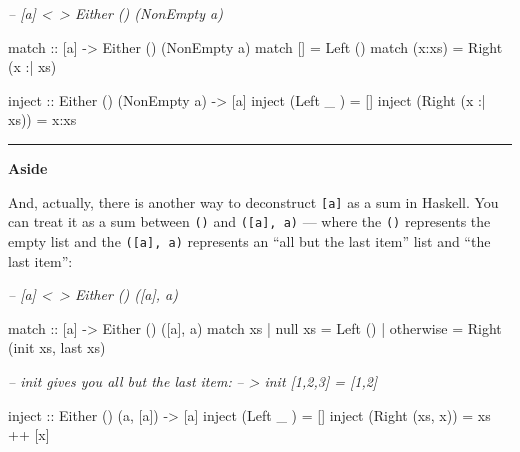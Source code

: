 \documentclass[]{article}
\newenvironment{Shaded}{}{}
\newcommand{\CommentTok}[1]{\textcolor[rgb]{0.38,0.63,0.69}{\textit{#1}}}
\newcommand{\DataTypeTok}[1]{\textcolor[rgb]{0.56,0.13,0.00}{#1}}
\newcommand{\FunctionTok}[1]{\textcolor[rgb]{0.02,0.16,0.49}{#1}}
\newcommand{\NormalTok}[1]{#1}
\newcommand{\OtherTok}[1]{\textcolor[rgb]{0.00,0.44,0.13}{#1}}
\begin{document}
\begin{Shaded}
\begin{Highlighting}[]
\CommentTok{-- [a] <~> Either () (NonEmpty a)}

\OtherTok{match ::}\NormalTok{ [a] }\OtherTok{->} \DataTypeTok{Either}\NormalTok{ () (}\DataTypeTok{NonEmpty}\NormalTok{ a)}
\NormalTok{match []     }\FunctionTok{=} \DataTypeTok{Left}\NormalTok{  ()}
\NormalTok{match (x}\FunctionTok{:}\NormalTok{xs) }\FunctionTok{=} \DataTypeTok{Right}\NormalTok{ (x }\FunctionTok{:|}\NormalTok{ xs)}

\OtherTok{inject ::} \DataTypeTok{Either}\NormalTok{ () (}\DataTypeTok{NonEmpty}\NormalTok{ a) }\OtherTok{->}\NormalTok{ [a]}
\NormalTok{inject (}\DataTypeTok{Left}\NormalTok{   _       ) }\FunctionTok{=}\NormalTok{ []}
\NormalTok{inject (}\DataTypeTok{Right}\NormalTok{ (x }\FunctionTok{:|}\NormalTok{ xs)) }\FunctionTok{=}\NormalTok{ x}\FunctionTok{:}\NormalTok{xs}
\end{Highlighting}
\end{Shaded}

\begin{center}\rule{0.5\linewidth}{\linethickness}\end{center}

\textbf{Aside}

And, actually, there is another way to deconstruct \texttt{{[}a{]}} as a sum in
Haskell. You can treat it as a sum between \texttt{()} and
\texttt{({[}a{]},\ a)} --- where the \texttt{()} represents the empty list and
the \texttt{({[}a{]},\ a)} represents an ``all but the last item'' list and
``the last item'':

\begin{Shaded}
\begin{Highlighting}[]
\CommentTok{-- [a] <~> Either () ([a], a)}

\OtherTok{match  ::}\NormalTok{ [a] }\OtherTok{->} \DataTypeTok{Either}\NormalTok{ () ([a], a)}
\NormalTok{match xs}
  \FunctionTok{|} \FunctionTok{null}\NormalTok{ xs   }\FunctionTok{=} \DataTypeTok{Left}\NormalTok{  ()}
  \FunctionTok{|} \FunctionTok{otherwise} \FunctionTok{=} \DataTypeTok{Right}\NormalTok{ (}\FunctionTok{init}\NormalTok{ xs, }\FunctionTok{last}\NormalTok{ xs)}

\CommentTok{-- init gives you all but the last item:}
\CommentTok{-- > init [1,2,3] = [1,2]}

\OtherTok{inject ::} \DataTypeTok{Either}\NormalTok{ () (a, [a]) }\OtherTok{->}\NormalTok{ [a]}
\NormalTok{inject (}\DataTypeTok{Left}\NormalTok{   _     ) }\FunctionTok{=}\NormalTok{ []}
\NormalTok{inject (}\DataTypeTok{Right}\NormalTok{ (xs, x)) }\FunctionTok{=}\NormalTok{ xs }\FunctionTok{++}\NormalTok{ [x]}
\end{Highlighting}
\end{Shaded}
\end{document}
